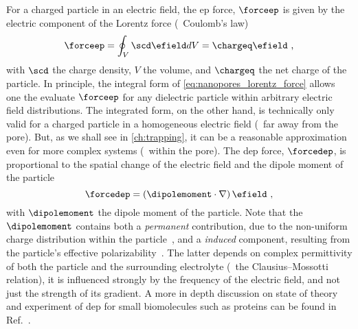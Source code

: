 For a charged particle in an electric field, the \gls{ep} force, $\forceep$ is given by the electric component
of the Lorentz force (\ie~Coulomb's law)~\cite{Lu-2012}
%
\begin{equation}\label{eq:nanopores_lorentz_force}
  \forceep = \oint_{V} \scd \efield dV = \chargeq \efield
  \text{ ,}
\end{equation}
%
with $\scd$ the charge density, $V$ the volume, and $\chargeq$ the net charge of the particle. In principle,
the integral form of \cref{eq:nanopores_lorentz_force} allows one the evaluate $\forceep$ for any dielectric
particle within arbitrary electric field distributions. The integrated form, on the other hand, is technically
only valid for a charged particle in a homogeneous electric field (\ie~far away from the pore). But, as we
shall see in \cref{ch:trapping}, it can be a reasonable approximation even for more complex systems
(\eg~within the pore). The \gls{dep} force, $\forcedep$, is proportional to the spatial change of the electric
field and the dipole moment of the particle~\cite{Hoelzel-2020}
%
\begin{equation}\label{eq:nanopores_dep_force}
  \forcedep = \left( \dipolemoment \cdot \nabla \right) \efield
  \text{ ,}
\end{equation}
%
with $\dipolemoment$ the dipole moment of the particle. Note that the $\dipolemoment$ contains both a
\emph{permanent} contribution, due to the non-uniform charge distribution within the
particle~\cite{Hoelzel-2020,VanMeervelt-2017}, and a \emph{induced} component, resulting from the particle's
effective polarizability~\cite{Minerick-2015}. The latter depends on complex permittivity of both the particle
and the surrounding electrolyte (\ie~the Clausius--Mossotti relation), it is influenced strongly by the
frequency of the electric field, and not just the strength of its gradient. A more in depth discussion on
state of theory and experiment of \gls{dep} for small biomolecules such as proteins can be found in
Ref.~\cite{Hoelzel-2020}.

